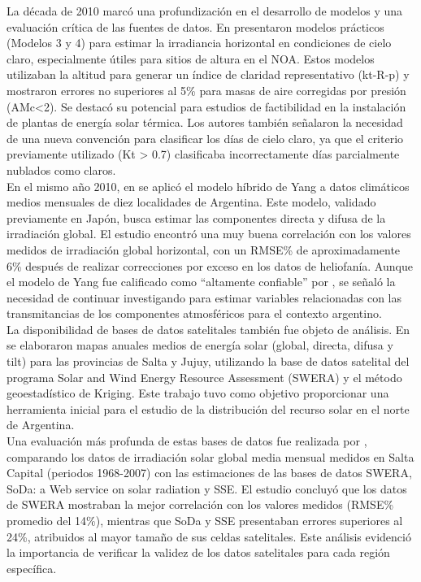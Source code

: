 La década de 2010 marcó una profundización en el desarrollo de modelos y una evaluación crítica de las fuentes de datos. En \cite{Salazar2010a} presentaron modelos prácticos (Modelos 3 y 4) para estimar la irradiancia horizontal en condiciones de cielo claro, especialmente útiles para sitios de altura en el NOA. Estos modelos utilizaban la altitud para generar un índice de claridad representativo (kt-R-p) y mostraron errores no superiores al 5\% para masas de aire corregidas por presión (AMc<2). Se destacó su potencial para estudios de factibilidad en la instalación de plantas de energía solar térmica. Los autores también señalaron la necesidad de una nueva convención para clasificar los días de cielo claro, ya que el criterio previamente utilizado (Kt > 0.7) clasificaba incorrectamente días parcialmente nublados como claros.\\

En el mismo año 2010, en \cite{Salazar2010b} se aplicó el modelo híbrido de Yang a datos climáticos medios mensuales de diez localidades de Argentina. Este modelo, validado previamente en Japón, busca estimar las componentes directa y difusa de la irradiación global. El estudio encontró una muy buena correlación con los valores medidos de irradiación global horizontal, con un RMSE\% de aproximadamente 6\% después de realizar correcciones por exceso en los datos de heliofanía. Aunque el modelo de Yang fue calificado como ``altamente confiable'' por \cite{Gueymard2003}, se señaló la necesidad de continuar investigando para estimar variables relacionadas con las transmitancias de los componentes atmosféricos para el contexto argentino.\\

La disponibilidad de bases de datos satelitales también fue objeto de análisis. En \cite{Laspiur2013} se elaboraron mapas anuales medios de energía solar (global, directa, difusa y tilt) para las provincias de Salta y Jujuy, utilizando la base de datos satelital del programa Solar and Wind Energy Resource Assessment (SWERA) \citep{OEDI} y el método geoestadístico de Kriging. Este trabajo tuvo como objetivo proporcionar una herramienta inicial para el estudio de la distribución del recurso solar en el norte de Argentina.\\

Una evaluación más profunda de estas bases de datos fue realizada por \cite{Salazar2013}, comparando los datos de irradiación solar global media mensual medidos en Salta Capital (periodos 1968-2007) con las estimaciones de las bases de datos SWERA, SoDa: a Web service on solar radiation \citep{Wald2004} y SSE. El estudio concluyó que los datos de SWERA mostraban la mejor correlación con los valores medidos (RMSE\% promedio del 14\%), mientras que SoDa y SSE presentaban errores superiores al 24\%, atribuidos al mayor tamaño de sus celdas satelitales. Este análisis evidenció la importancia de verificar la validez de los datos satelitales para cada región específica.\\ 

